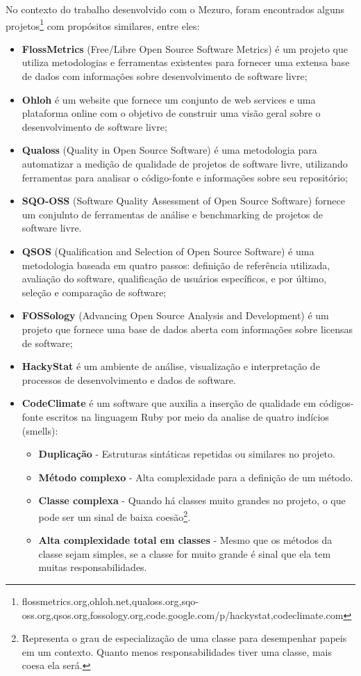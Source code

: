 No contexto do trabalho desenvolvido com o Mezuro, foram encontrados alguns projetos\footnote{flossmetrics.org,ohloh.net,qualoss.org,sqo-oss.org,qsos.org,fossology.org,code.google.com/p/hackystat,codeclimate.com} com propósitos similares\cite{meirelles2010mezuro}, entre eles:

\begin{itemize}
\item \textbf{FlossMetrics} (Free/Libre Open Source Software Metrics) é um projeto que utiliza metodologias e ferramentas existentes para fornecer  uma extensa base de dados com informações sobre desenvolvimento de software livre;
\item \textbf{Ohloh} é um website que fornece um conjunto de web services e uma plataforma online com o objetivo de construir uma visão geral sobre o desenvolvimento de software livre;
\item \textbf{Qualoss} (Quality in Open Source Software) é  uma metodologia para automatizar a medição de qualidade de projetos de software livre, utilizando ferramentas para analisar o código-fonte e informações sobre seu repositório;
\item \textbf{SQO-OSS} (Software Quality Assessment of Open Source Software) fornece um conjulnto de ferramentas de análise e benchmarking de projetos de software livre.
\item \textbf{QSOS} (Qualification and Selection of Open Source Software) é uma metodologia baseada em quatro passos: definição de referência utilizada, avaliação do software, qualificação de usuários específicos, e por último, seleção e comparação de software;
\item \textbf{FOSSology} (Advancing Open Source Analysis and Development) é um projeto que fornece uma base de dados aberta com informações sobre licensas de software;
\item \textbf{HackyStat} é um ambiente de análise, visualização e interpretação de processos de desenvolvimento e dados de software.
\item \textbf{CodeClimate} é um software que auxilia a inserção de qualidade em códigos-fonte escritos na linguagem Ruby por meio da analise de quatro indícios (smells): 
	\begin{itemize}
	\item \textbf{Duplicação} - Estruturas sintáticas repetidas ou similares no projeto.
	\item \textbf{Método complexo} - Alta complexidade para a definição de um método.
	\item \textbf{Classe complexa} - Quando há classes muito grandes no projeto, o que pode ser um sinal de baixa coesão\footnote{Representa o grau de especialização de uma classe para desempenhar papeis em um contexto. Quanto menos responsabilidades tiver uma classe, mais coesa ela será.}.
	\item \textbf{Alta complexidade total em classes} - Mesmo que os métodos da classe sejam simples, se a classe for muito grande é sinal que ela tem muitas responsabilidades.
	\end{itemize}
\end{itemize}
    

